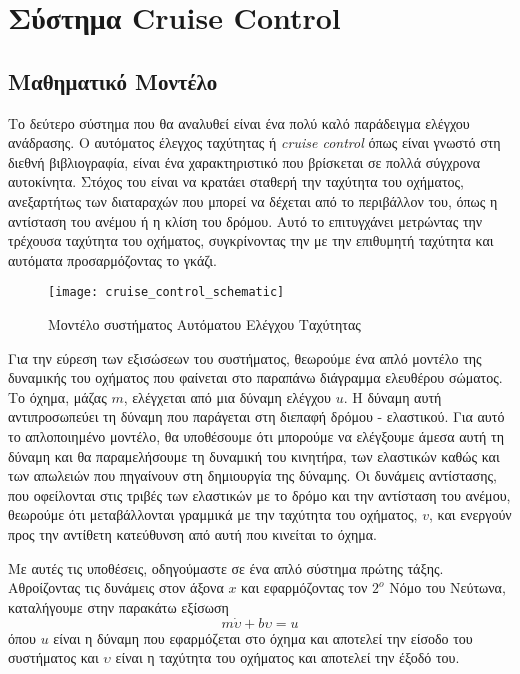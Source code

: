 \section{Σύστημα Cruise Control}

\subsection{Μαθηματικό Μοντέλο}

Το δεύτερο σύστημα που θα αναλυθεί είναι ένα πολύ καλό παράδειγμα ελέγχου ανάδρασης. Ο αυτόματος έλεγχος ταχύτητας ή \emph{cruise control} όπως είναι γνωστό στη διεθνή βιβλιογραφία, είναι ένα χαρακτηριστικό που βρίσκεται σε πολλά σύγχρονα αυτοκίνητα. Στόχος του είναι να κρατάει σταθερή την ταχύτητα του οχήματος, ανεξαρτήτως των διαταραχών που μπορεί να δέχεται από το περιβάλλον του, όπως η αντίσταση του ανέμου ή η κλίση του δρόμου. Αυτό το επιτυγχάνει μετρώντας την τρέχουσα ταχύτητα του οχήματος, συγκρίνοντας την με την επιθυμητή ταχύτητα και αυτόματα προσαρμόζοντας το γκάζι.

\begin{figure}[h]
  \centering
  \texttt{[image: cruise\_control\_schematic]}
  \caption{Μοντέλο συστήματος Αυτόματου Ελέγχου Ταχύτητας}
  \label{fig:cruise_control_schematic}
\end{figure}

Για την εύρεση των εξισώσεων του συστήματος, θεωρούμε ένα απλό μοντέλο της δυναμικής του οχήματος που φαίνεται στο παραπάνω διάγραμμα ελευθέρου σώματος. Το όχημα, μάζας $m$, ελέγχεται από μια δύναμη ελέγχου $u$. Η δύναμη αυτή αντιπροσωπεύει τη δύναμη που παράγεται στη διεπαφή δρόμου - ελαστικού. Για αυτό το απλοποιημένο μοντέλο, θα υποθέσουμε ότι μπορούμε να ελέγξουμε άμεσα αυτή τη δύναμη και θα παραμελήσουμε τη δυναμική του κινητήρα, των ελαστικών καθώς και των απωλειών που πηγαίνουν στη δημιουργία της δύναμης. Οι δυνάμεις αντίστασης, που οφείλονται στις τριβές των ελαστικών με το δρόμο και την αντίσταση του ανέμου, θεωρούμε ότι μεταβάλλονται γραμμικά με την ταχύτητα του οχήματος, $v$, και ενεργούν προς την αντίθετη κατεύθυνση από αυτή που κινείται το όχημα.

Με αυτές τις υποθέσεις, οδηγούμαστε σε ένα απλό σύστημα πρώτης τάξης. Αθροίζοντας τις δυνάμεις στον άξονα $x$ και εφαρμόζοντας τον $2^o$ Νόμο του Νεύτωνα, καταλήγουμε στην παρακάτω εξίσωση
\begin{equation}
m\dot{\upsilon} + b\upsilon = u
\label{eq:cruise_control_ode}
\end{equation}
όπου $u$ είναι η δύναμη που εφαρμόζεται στο όχημα και αποτελεί την είσοδο του συστήματος και $\upsilon$ είναι η ταχύτητα του οχήματος και αποτελεί την έξοδό του.

